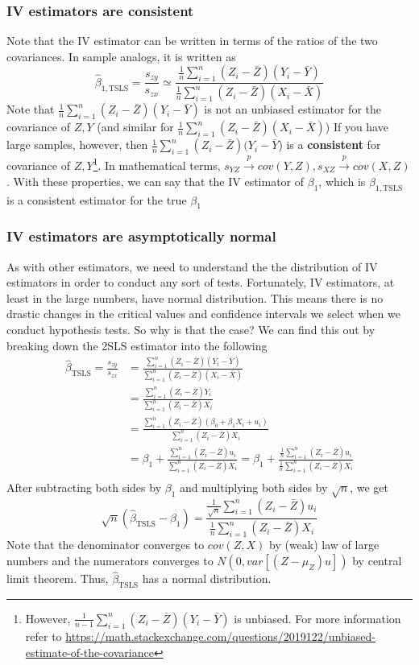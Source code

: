 \documentclass[12pt]{article}
\theoremstyle{definition}
\theoremstyle{property}
\theoremstyle{assumption}
\theoremstyle{example}
\theoremstyle{comment}
\begin{document}
\subsubsection{IV estimators are consistent}
Note that the IV estimator can be written in terms of the ratios of the two covariances. In sample analogs, it is written as
\[
\hat{\beta}_{1,\text{TSLS}}=\frac{s_{zy}}{s_{zx}}\simeq\frac{\frac{1}{n}\sum_{i=1}^n(Z_i-\bar{Z})(Y_i-\bar{Y})}{\frac{1}{n}\sum_{i=1}^n(Z_i-\bar{Z})(X_i-\bar{X})}
\]
Note that $\frac{1}{n}\sum_{i=1}^n(Z_i-\bar{Z})(Y_i-\bar{Y})$ is not an unbiased estimator for the covariance of $Z,Y$ (and similar for $\frac{1}{n}\sum_{i=1}^n(Z_i-\bar{Z})(X_i-\bar{X})$) If you have large samples, however, then $\frac{1}{n}\sum_{i=1}^n(Z_i-\bar{Z})(Y_i-\bar{Y}$) is a \textbf{consistent} for covariance of $Z,Y$\footnote{However, $\frac{1}{n-1}\sum_{i=1}^n(Z_i-\bar{Z})(Y_i-\bar{Y})$ is unbiased. For more information refer to \url{https://math.stackexchange.com/questions/2019122/unbiased-estimate-of-the-covariance}}. In mathematical terms, $s_{YZ}\xrightarrow{p} cov(Y,Z),  s_{XZ}\xrightarrow{p} cov(X,Z)$. With these properties, we can say that the IV estimator of $\beta_1$, which is $\hat{\beta}_{1,\text{TSLS}}$ is a consistent estimator for the true $\beta_1$ \par\medskip

\subsubsection{IV estimators are asymptotically normal}
As with other estimators, we need to understand the the distribution of IV estimators in order to conduct any sort of tests. Fortunately, IV estimators, at least in the large numbers, have normal distribution. This means there is no drastic changes in the critical values and confidence intervals we select when we conduct hypothesis tests. So why is that the case? We can find this out by breaking down the 2SLS estimator into the following
\[
\begin{aligned}
\hat{\beta}_{\text{TSLS}}=\frac{s_{zy}}{s_{zx}}&=\frac{\sum_{i=1}^n(Z_i-\bar{Z})(Y_i-\bar{Y})}{\sum_{i=1}^n(Z_i-\bar{Z})(X_i-\bar{X})}\\
&= \frac{\sum_{i=1}^n(Z_i-\bar{Z})Y_i}{\sum_{i=1}^n(Z_i-\bar{Z})X_i}\\
&= \frac{\sum_{i=1}^n(Z_i-\bar{Z})(\beta_0+\beta_1X_i + u_i)}{\sum_{i=1}^n(Z_i-\bar{Z})X_i}\\
&= \beta_1+\frac{\sum_{i=1}^n(Z_i-\bar{Z})u_i}{\sum_{i=1}^n(Z_i-\bar{Z})X_i}=\beta_1+\frac{\frac{1}{n}\sum_{i=1}^n(Z_i-\bar{Z})u_i}{\frac{1}{n}\sum_{i=1}^n(Z_i-\bar{Z})X_i}\\
\end{aligned}
\]
After subtracting both sides by $\beta_1$ and multiplying both sides by $\sqrt{n}$, we get
\[
\sqrt{n}(\hat{\beta}_{\text{TSLS}}-\beta_1)=\frac{\frac{1}{\sqrt{n}}\sum_{i=1}^n(Z_i-\bar{Z})u_i}{\frac{1}{n}\sum_{i=1}^n(Z_i-\bar{Z})X_i}
\]
Note that the denominator converges to $cov(Z,X)$ by (weak) law of large numbers and the numerators converges to $N(0, var[(Z-\mu_Z)u])$ by central limit theorem. Thus, $\hat{\beta}_{\text{TSLS}}$ has a normal distribution.
\end{document}
